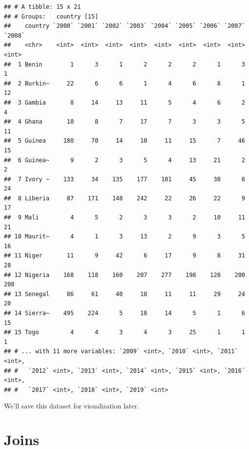 \documentclass[12pt,letterpaperpaper,openany]{book}
\newenvironment{Shaded}{\begin{snugshade}}{\end{snugshade}}
\newcommand{\KeywordTok}[1]{\textcolor[rgb]{0.13,0.29,0.53}{\textbf{#1}}}
\newcommand{\NormalTok}[1]{#1}
\newcommand{\OperatorTok}[1]{\textcolor[rgb]{0.81,0.36,0.00}{\textbf{#1}}}
\newcommand{\StringTok}[1]{\textcolor[rgb]{0.31,0.60,0.02}{#1}}
\begin{document}
\begin{verbatim}
## # A tibble: 15 x 21
## # Groups:   country [15]
##    country `2000` `2001` `2002` `2003` `2004` `2005` `2006` `2007` `2008`
##    <chr>    <int>  <int>  <int>  <int>  <int>  <int>  <int>  <int>  <int>
##  1 Benin        1      3      1      2      2      2      1      3      1
##  2 Burkin~     22      6      6      1      4      6      8      1     12
##  3 Gambia       8     14     13     11      5      4      6      2      4
##  4 Ghana       10      8      7     17      7      3      3      5     11
##  5 Guinea     180     70     14     10     11     15      7     46     15
##  6 Guinea~      9      2      3      5      4     13     21      2      2
##  7 Ivory ~    133     34    135    177    101     45     30      6     24
##  8 Liberia     87    171    148    242     22     26     22      9     17
##  9 Mali         4      5      2      3      3      2     10     11     21
## 10 Maurit~      4      1      3     13      2      9      3      5     16
## 11 Niger       11      9     42      6     17      9      8     31     28
## 12 Nigeria    168    118    160    207    277    198    120    200    208
## 13 Senegal     86     61     40     18     11     11     29     24     20
## 14 Sierra~    495    224      5     18     14      5      1      6     15
## 15 Togo         4      4      3      4      3     25      1      1      1
## # ... with 11 more variables: `2009` <int>, `2010` <int>, `2011` <int>,
## #   `2012` <int>, `2013` <int>, `2014` <int>, `2015` <int>, `2016` <int>,
## #   `2017` <int>, `2018` <int>, `2019` <int>
\end{verbatim}

We'll save this dataset for visualization later.

\begin{Shaded}
\end{Shaded}

\hypertarget{joins}{%
\section{Joins}\label{joins}}
\end{document}
